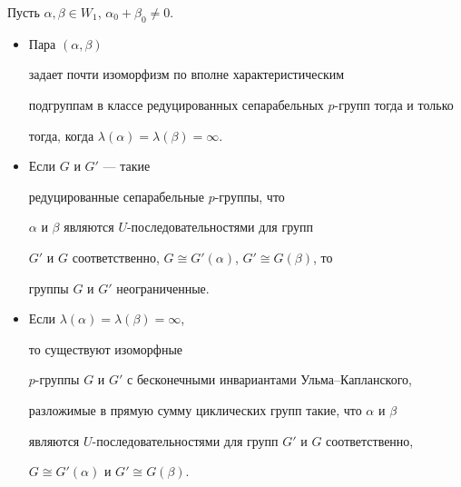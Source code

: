 \begin{thms}


Пусть $\alpha,\beta\in W_1$, $\alpha_0+\beta_0\neq0$.


\begin{itemize}


\item[1)] Пара $(\alpha,\beta)$


задает почти изоморфизм по вполне характеристическим


подгруппам в классе редуцированных сепарабельных $p$-групп тогда и только


тогда, когда $\lambda(\alpha)=\lambda(\beta)=\infty$.


\item[2)] Если $G$ и $G'$ --- такие


редуцированные сепарабельные $p$-группы, что


$\alpha$ и $\beta$ являются $U$-последовательностями для групп


$G'$ и $G$ соответственно, $G\cong G'(\alpha)$, $G'\cong G(\beta)$, то


группы $G$ и $G'$ неограниченные.


\item[3)] Если $\lambda(\alpha)=\lambda(\beta)=\infty$,


то существуют изоморфные


$p$-группы $G$ и $G'$ с бесконечными инвариантами Ульма--Капланского,


разложимые в прямую сумму циклических групп такие, что $\alpha$ и $\beta$


являются $U$-последовательностями для групп $G'$ и $G$ соответственно,


$G\cong G'(\alpha)$ и $G'\cong G(\beta)$.


\end{itemize}


\end{thms}





